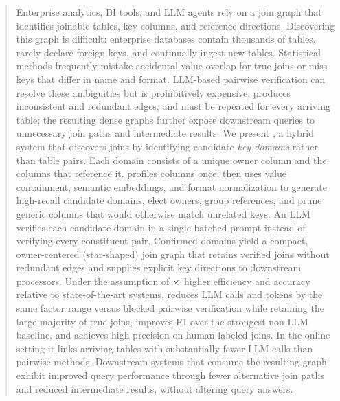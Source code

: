 \begin{abstract}
Enterprise analytics, BI tools, and LLM agents rely on a join graph that identifies joinable tables, key columns, and reference directions. Discovering this graph is difficult: enterprise databases contain thousands of tables, rarely declare foreign keys, and continually ingest new tables. 
Statistical methods frequently mistake accidental value overlap for true joins or miss keys that differ in name and format. LLM-based pairwise verification can resolve these ambiguities but is prohibitively expensive, produces inconsistent and redundant edges, and must be repeated for every arriving table; the resulting dense graphs further expose downstream queries to unnecessary join paths and intermediate results.
We present \ourmethod, a hybrid system that discovers joins by identifying candidate \emph{key domains} rather than table pairs. Each domain consists of a unique owner column and the columns that reference it. \ourmethod profiles columns once, then uses value containment, semantic embeddings, and format normalization to generate high-recall candidate domains, elect owners, group references, and prune generic columns that would otherwise match unrelated keys. An LLM verifies each candidate domain in a single batched prompt instead of verifying every constituent pair. Confirmed domains yield a compact, owner-centered (star-shaped) join graph that retains verified joins without redundant edges and supplies explicit key directions to downstream processors.
Under the assumption of $\todo{N}\times$ higher efficiency and accuracy relative to state-of-the-art systems, \ourmethod reduces LLM calls and tokens by the same factor range versus blocked pairwise verification while retaining the large majority of true joins, improves F1 over the strongest non-LLM baseline, and achieves high precision on human-labeled joins. In the online setting it links arriving tables with substantially fewer LLM calls than pairwise methods. Downstream systems that consume the resulting graph exhibit improved query performance through fewer alternative join paths and reduced intermediate results, without altering query answers.
\end{abstract}
